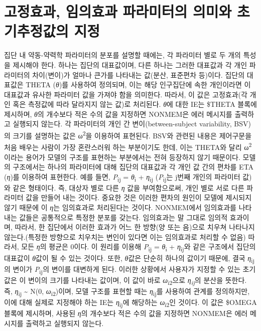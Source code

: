 \documentclass[
  11pt,
  krantz2,
  a4paper]{krantz}
\theoremstyle{definition}
\theoremstyle{definition}
\theoremstyle{definition}
\theoremstyle{remark}
\begin{document}
\hypertarget{fixed-random-meaning}{%
\section{고정효과, 임의효과 파라미터의 의미와 초기추정값의 지정}\label{fixed-random-meaning}}


집단 내 약동-약력학 파라미터의 분포를 설명할 때에는, 각 파라미터 별로 두 개의 특성을 제시해야 한다. 하나는 집단의 대표값이며, 다른 하나는 그러한 대표값과 각 개인 파라미터의 차이(변이)가 얼마나 큰가를 나타내는 값(분산, 표준편차 등)이다. 집단의 대표값은 THETA (\emph{θ})를 사용하여 정의되며, 이는 해당 인구집단에 속한 개인이라면 이 대표값과 유사한 파라미터 값을 가져야 함을 의미한다. 따라서, 이 값은 고정효과(각 개인 혹은 측정값에 따라 달라지지 않는 값)로 처리된다. \emph{θ}에 대한 IE는 \$THETA 블록에 제시하며, \emph{θ}의 개수보다 적은 수의 값을 지정하면 NONMEM은 에러 메시지를 출력하고 실행되지 않는다. 각 파라미터의 개인 간 변이(between-subject variability, BSV)의 크기를 설명하는 값은 ω\textsuperscript{2}을 이용하여 표현된다. BSV와 관련된 내용은 제어구문을 처음 배우는 사람이 가장 혼란스러워 하는 부분이기도 한데, 이는 THETA와 달리 ω\textsuperscript{2}이라는 용어가 모델의 구조를 표현하는 부분에서는 전혀 등장하지 않기 때문이다. 모델의 구조에서는 하나의 파라미터에 대해 집단의 대표값과 각 개인 값 간의 편차를 ETA (\emph{η})를 이용하여 표현한다. 예를 들면, \emph{P}\textsubscript{ij} = \emph{θ}\textsubscript{i} + \emph{η}\textsubscript{ij} (\emph{P}\textsubscript{ij}는 j번째 개인의 파라미터 값)와 같은 형태이다. 즉, 대상자 별로 다른 \emph{η} 값을 부여함으로써, 개인 별로 서로 다른 파라미터 값을 만들어 내는 것이다. 중요한 것은 이러한 편차의 원인이 모델에 제시되지 않기 때문에 이 \emph{η}는 임의효과로 처리된다는 것이다. NONMEM에서 임의효과를 나타내는 값들은 공통적으로 특정한 분포를 갖는다. 임의효과는 말 그대로 임의적 효과이며, 따라서, 한 집단에서 이러한 효과가 어느 한 방향(양 또는 음)으로 치우쳐 나타나지 않는다.(특정한 방향으로 치우치는 변인이 있다면 이는 임의효과로 처리할 수 없음) 따라서, 모든 \emph{η}의 평균은 0이다. 이 원리를 이용해 \emph{P}\textsubscript{ij} = \emph{θ}\textsubscript{i} + \emph{η}\textsubscript{ij}와 같은 구조에서 집단의 대표값이 \emph{θ}값이 될 수 있는 것이다. 또한, \emph{θ}값은 단순히 하나의 값이기 때문에, 결국 \emph{η}\textsubscript{ij}의 변이가 \emph{P}\textsubscript{ij}의 변이를 대변하게 된다. 이러한 상황에서 사용자가 지정할 수 있는 초기값은 이 변이의 크기를 나타내는 값이며, 이 값이 바로 \emph{ω}\textsubscript{i2}으로 \emph{η\textsubscript{ij}}의 분산을 뜻한다. 즉, \emph{η}\textsubscript{ij} \textasciitilde{} N(0, \emph{ω}\textsubscript{i2})이며, 모델 구조를 표현할 때는 \emph{η}\textsubscript{ij}를 사용하여 관계를 정의하지만, 이에 대해 실제로 지정해야 하는 IE는 \emph{η}\textsubscript{ij}에 해당하는 \emph{ω}\textsubscript{i2}인 것이다. 이 값은 \$OMEGA 블록에 제시하며, 사용된 \emph{η}의 개수보다 적은 수의 값을 지정하면 NONMEM은 에러 메시지를 출력하고 실행되지 않는다.
\end{document}
